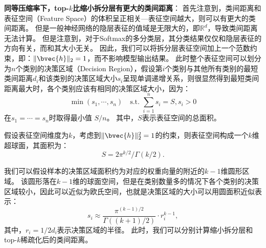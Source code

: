\textbf{同等压缩率下，top-$k$比缩小拆分层有更大的类间距离}：
首先注意到，类间距离和表征空间（Feature Space）的体积呈正相关---表征空间越大，则可以有更大的类间距离。
%
但是一般神经网络的隐层表征的值域是无限大的，即$\mathbb R^d$，导致类间距离无法计算。
%
但是注意到，对于Softmax的多分类层，其分类结果仅仅和隐层表征的方向有关，而和其大小无关。
%
因此，我们可以将拆分层表征空间加上一个范数约束，即：$\Vert \bvec{h} \Vert_2 = 1$，而不影响模型输出结果。
%
此时整个表征空间可以划分为$n$个类别的决策区域（Decision Region），假设第$i$个类别与其他所有类别的最短类间距离$d_i$和该类别的决策区域大小$s_i$呈现单调递增关系，则很显然得到最短类间距离最大时，各个类别应该有相同的决策区域大小，因为：
\begin{equation}
    \min (s_1, \cdots, s_n) \quad \text{s.t. } {\sum_{i=1}^n s_i = S, s_i > 0}
\end{equation}
在$s_1 = \cdots = s_n$时取得最小值 $S/n$。
其中，$S$表示表征空间的总面积。

假设表征空间维度为$k$，考虑到$\Vert \bvec{h} \Vert^2_2 = 1$的约束，则表征空间构成一个$k$维超球面，其面积为：
\begin{equation}
    S = 2\pi^{k/2}/\Gamma(k/2).
\end{equation}



我们可以假设样本的决策区域面积约为对应的权重向量的附近的$k-1$维圆形区域。
该圆形落在$k-1$维的球面空间，但是在类别数量多的情况下各个类别的决策区域较小，因此可以近似为欧氏空间，也就是决策区域的大小可以用圆面积近似表示：
\begin{equation}
    s_i \approx \dfrac{\pi^{(k-1)/2}}{\Gamma((k+1)/2)} \cdot r_i^{k-1},
\end{equation}
其中，$r_i = 1/2 d_i$表示决策区域的半径。
%
此时，我们可以分别计算缩小拆分层和top-$k$稀疏化后的类间距离。



